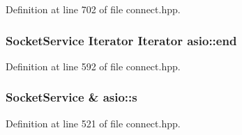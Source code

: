 Definition at line 702 of file connect.\+hpp.

\hypertarget{group__async__connect_gadb6ad0193229ae84828688e812cd325c}{}
\subsubsection[{end}]{\setlength{\rightskip}{0pt plus 5cm}Socket\+Service Iterator Iterator asio\+::end}\label{group__async__connect_gadb6ad0193229ae84828688e812cd325c}


Definition at line 592 of file connect.\+hpp.

\hypertarget{group__async__connect_ga31ab74b9ea6c77932dddd016cfc7920a}{}
\subsubsection[{s}]{\setlength{\rightskip}{0pt plus 5cm}Socket\+Service \& asio\+::s}\label{group__async__connect_ga31ab74b9ea6c77932dddd016cfc7920a}


Definition at line 521 of file connect.\+hpp.

